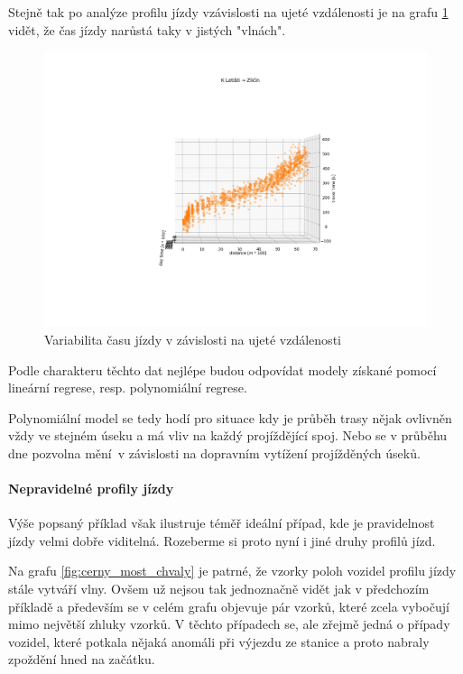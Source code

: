 Stejně tak po analýze profilu jízdy vzávislosti na ujeté vzdálenosti je na grafu \ref{fig:dojezd_podle_vzdalenosti} vidět, že čas jízdy narůstá taky v jistých "vlnách".

\begin{figure}
	\centering
  \includegraphics[width=\linewidth]{../img/dojezd_podle_vzdalenosti.png}
  \caption{Variabilita času jízdy v závislosti na ujeté vzdálenosti}
  \label{fig:dojezd_podle_vzdalenosti}
\end{figure}

Podle charakteru těchto dat nejlépe budou odpovídat modely získané pomocí lineární regrese, resp. polynomiální regrese.

\bigbreak

Polynomiální model se tedy hodí pro situace kdy je průběh trasy nějak ovlivněn vždy ve stejném úseku a má vliv na každý projíždějící spoj. Nebo se v průběhu dne pozvolna mění v závislosti na dopravním vytížení projížděných úseků.

\paragraph{Nepravidelné profily jízdy}

Výše popsaný příklad však ilustruje téměř ideální případ, kde je pravidelnost jízdy velmi dobře viditelná. Rozeberme si proto nyní i jiné druhy profilů jízd.

\bigbreak

Na grafu \ref{fig:cerny_most_chvaly} je patrné, že vzorky poloh vozidel profilu jízdy stále vytváří vlny. Ovšem už nejsou tak jednoznačně vidět jak v předchozím příkladě a především se v celém grafu objevuje pár vzorků, které zcela vybočují mimo největší zhluky vzorků. V těchto případech se, ale zřejmě jedná o případy vozidel, které potkala nějaká anomáli při výjezdu ze stanice a proto nabraly zpoždění hned na začátku.

